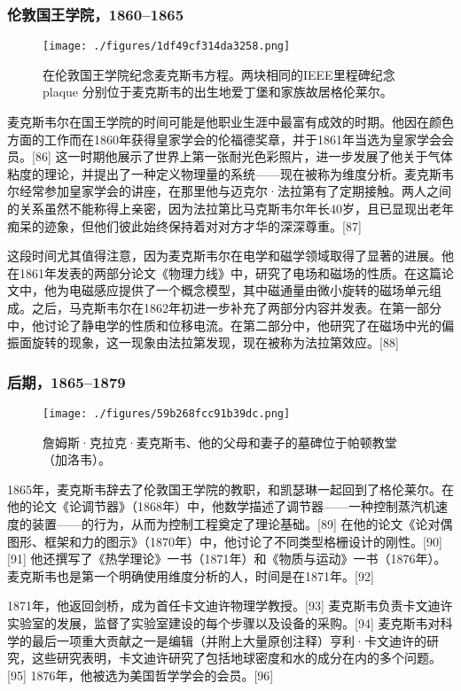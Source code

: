 \subsubsection{伦敦国王学院，1860–1865}
\begin{figure}[ht]
\centering
\texttt{[image: ./figures/1df49cf314da3258.png]}
\caption{在伦敦国王学院纪念麦克斯韦方程。两块相同的IEEE里程碑纪念 plaque 分别位于麦克斯韦的出生地爱丁堡和家族故居格伦莱尔。} \label{fig_Clerk_4}
\end{figure}
麦克斯韦尔在国王学院的时间可能是他职业生涯中最富有成效的时期。他因在颜色方面的工作而在1860年获得皇家学会的伦福德奖章，并于1861年当选为皇家学会会员。[86] 这一时期他展示了世界上第一张耐光色彩照片，进一步发展了他关于气体粘度的理论，并提出了一种定义物理量的系统——现在被称为维度分析。麦克斯韦尔经常参加皇家学会的讲座，在那里他与迈克尔·法拉第有了定期接触。两人之间的关系虽然不能称得上亲密，因为法拉第比马克斯韦尔年长40岁，且已显现出老年痴呆的迹象，但他们彼此始终保持着对对方才华的深深尊重。[87]

这段时间尤其值得注意，因为麦克斯韦尔在电学和磁学领域取得了显著的进展。他在1861年发表的两部分论文《物理力线》中，研究了电场和磁场的性质。在这篇论文中，他为电磁感应提供了一个概念模型，其中磁通量由微小旋转的磁场单元组成。之后，马克斯韦尔在1862年初进一步补充了两部分内容并发表。在第一部分中，他讨论了静电学的性质和位移电流。在第二部分中，他研究了在磁场中光的偏振面旋转的现象，这一现象由法拉第发现，现在被称为法拉第效应。[88]
\subsubsection{后期，1865–1879}
\begin{figure}[ht]
\centering
\texttt{[image: ./figures/59b268fcc91b39dc.png]}
\caption{詹姆斯·克拉克·麦克斯韦、他的父母和妻子的墓碑位于帕顿教堂（加洛韦）。} \label{fig_Clerk_8}
\end{figure}
1865年，麦克斯韦辞去了伦敦国王学院的教职，和凯瑟琳一起回到了格伦莱尔。在他的论文《论调节器》（1868年）中，他数学描述了调节器——一种控制蒸汽机速度的装置——的行为，从而为控制工程奠定了理论基础。[89] 在他的论文《论对偶图形、框架和力的图示》（1870年）中，他讨论了不同类型格栅设计的刚性。[90][91] 他还撰写了《热学理论》一书（1871年）和《物质与运动》一书（1876年）。麦克斯韦也是第一个明确使用维度分析的人，时间是在1871年。[92]

1871年，他返回剑桥，成为首任卡文迪许物理学教授。[93] 麦克斯韦负责卡文迪许实验室的发展，监督了实验室建设的每个步骤以及设备的采购。[94] 麦克斯韦对科学的最后一项重大贡献之一是编辑（并附上大量原创注释）亨利·卡文迪许的研究，这些研究表明，卡文迪许研究了包括地球密度和水的成分在内的多个问题。[95] 1876年，他被选为美国哲学学会的会员。[96]
